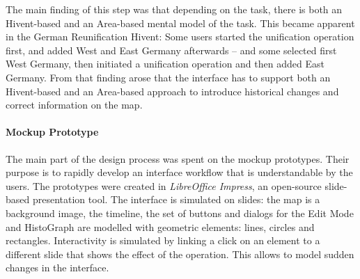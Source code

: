 The main finding of this step was that depending on the task, there is both an Hivent-based and an Area-based mental model of the task. This became apparent in the German Reunification Hivent: Some users started the unification operation first, and added West and East Germany afterwards -- and some selected first West Germany, then initiated a unification operation and then added East Germany. From that finding arose that the interface has to support both an Hivent-based and an Area-based approach to introduce historical changes and correct information on the map.


\paragraph{Mockup Prototype} %
\label{par:mockup_prototype}

The main part of the design process was spent on the mockup prototypes. Their purpose is to rapidly develop an interface workflow that is understandable by the users. The prototypes were created in \emph{LibreOffice Impress}, an open-source slide-based presentation tool. The interface is simulated on slides: the map is a background image, the timeline, the set of buttons and dialogs for the Edit Mode and HistoGraph are modelled with geometric elements: lines, circles and rectangles. Interactivity is simulated by linking a click on an element to a different slide that shows the effect of the operation. This allows to model sudden changes in the interface.


